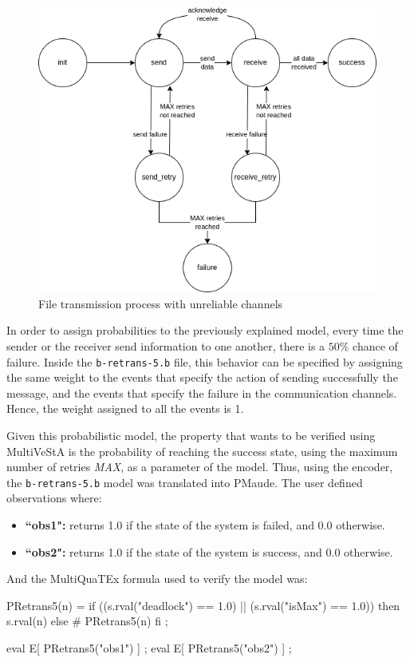 \begin{figure}[H]
    \centering
    \includegraphics[scale = 0.6]{images/CS8.png}
    \caption{File transmission process with unreliable channels}
    \label{fig:cs8}
\end{figure}
In order to assign probabilities to the previously explained model, every time the sender or the receiver send information to one another, there is a $50\%$ chance of failure. Inside the \texttt{b-retrans-5.b} file, this behavior can be specified by assigning the same weight to the events that specify the action of sending successfully the message, and the events that specify the failure in the communication channels. Hence, the weight assigned to all the events is 1.

Given this probabilistic model, the property that wants to be verified using MultiVeStA is the probability of reaching the success state, using the maximum number of retries \textit{MAX}, as a parameter of the model. Thus, using the encoder, the \texttt{b-retrans-5.b} model was translated into PMaude. The user defined observations where:
\begin{itemize}
    \item \textbf{``obs1":} returns 1.0 if the state of the system is failed, and 0.0 otherwise.
    \item \textbf{``obs2":} returns 1.0 if the state of the system is success, and 0.0 otherwise.
\end{itemize}
And the MultiQuaTEx formula used to verify the model was:
\begin{maude2}

PRetrans5(n) = if ((s.rval("deadlock") == 1.0) || (s.rval("isMax") == 1.0)) 
               then s.rval(n) else # PRetrans5(n) fi ;

eval E[ PRetrans5("obs1") ] ;
eval E[ PRetrans5("obs2") ] ;
\end{maude2}

